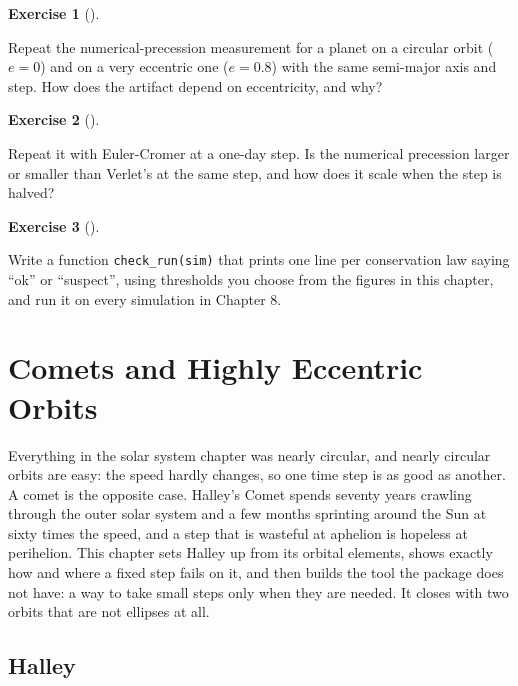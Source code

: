 \documentclass[
  10.5pt,
  letterpaper,
]{scrbook}
\theoremstyle{definition}
\newtheorem{exercise}{Exercise}[chapter]
\theoremstyle{plain}
\theoremstyle{remark}
\begin{document}
\begin{exercise}[]\protect\hypertarget{exr-ch12-precession-e}{}\label{exr-ch12-precession-e}

Repeat the numerical-precession measurement for a planet on a circular
orbit (\(e = 0\)) and on a very eccentric one (\(e = 0.8\)) with the
same semi-major axis and step. How does the artifact depend on
eccentricity, and why?

\end{exercise}

\begin{exercise}[]\protect\hypertarget{exr-ch12-euler-cromer-precession}{}\label{exr-ch12-euler-cromer-precession}

Repeat it with Euler-Cromer at a one-day step. Is the numerical
precession larger or smaller than Verlet's at the same step, and how
does it scale when the step is halved?

\end{exercise}

\begin{exercise}[]\protect\hypertarget{exr-ch12-full}{}\label{exr-ch12-full}

Write a function \texttt{check\_run(sim)} that prints one line per
conservation law saying ``ok'' or ``suspect'', using thresholds you
choose from the figures in this chapter, and run it on every simulation
in Chapter 8.

\end{exercise}

\chapter{Comets and Highly Eccentric Orbits}\label{sec-comets}

Everything in the solar system chapter was nearly circular, and nearly
circular orbits are easy: the speed hardly changes, so one time step is
as good as another. A comet is the opposite case. Halley's Comet spends
seventy years crawling through the outer solar system and a few months
sprinting around the Sun at sixty times the speed, and a step that is
wasteful at aphelion is hopeless at perihelion. This chapter sets Halley
up from its orbital elements, shows exactly how and where a fixed step
fails on it, and then builds the tool the package does not have: a way
to take small steps only when they are needed. It closes with two orbits
that are not ellipses at all.

\section{Halley}\label{halley}
\end{document}
